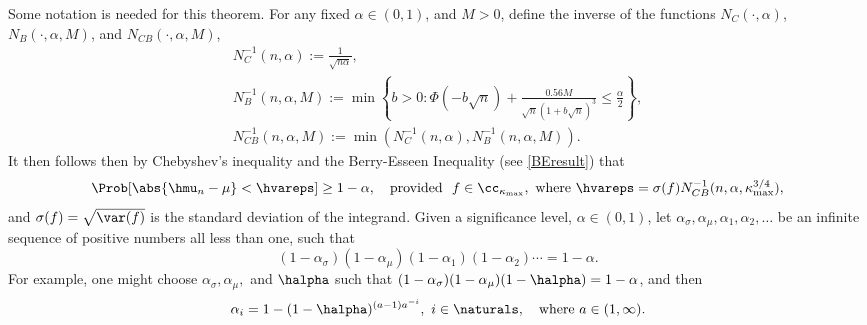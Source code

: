 \documentclass[graybox]{svmult}
\begin{document}
Some notation is needed for this theorem.  For any fixed $\alpha \in (0,1)$, and $M>0$, define the inverse of the functions $N_C(\cdot,\alpha)$, $N_B(\cdot,\alpha,M)$, and $N_{CB}(\cdot,\alpha,M)$,
\begin{gather*}\label{NCinv}
N_C^{-1}(n,\alpha) := \frac{1}{\sqrt{n \alpha}}, \\
\label{NBinv*}
N_B^{-1}(n,\alpha,M) := \min \left \{ b>0 : \Phi\left(-b \sqrt{n}  \right)+\frac{0.56M}{\sqrt{n}\left(1+ b\sqrt{n} \right)^{3}}
\le \frac{\alpha}{2} \right \}, \\
\label{NCBinv*}
N_{CB}^{-1}(n,\alpha,M) := \min(N_C^{-1}(n,\alpha),N_B^{-1}(n,\alpha,M)).
\end{gather*}
It then follows then by Chebyshev's inequality and the Berry-Esseen Inequality (see \eqref{BEresult}) that 
\begin{equation*}
\Prob[\abs{\hmu_n -\mu}<\hvareps] \geq 1-\alpha, \quad \text{provided } \ f \in \cc_{\kappa_{\max}}, \text{ where }\hvareps=\sigma(f) N_{CB}^{-1}(n,\alpha,\kappa_{\max}^{3/4}), 
\end{equation*} 
and $\sigma(f)=\sqrt{\var(f)}$ is the standard deviation of the integrand.  Given a significance level, $\alpha \in (0,1)$, let $\alpha_{\sigma}, \alpha_{\mu}, \alpha_1,  \alpha_2, \ldots$ be an infinite sequence of positive numbers all less than one, such that 
\begin{equation} \label{alphaseq}
(1-\alpha_{\sigma})(1-\alpha_{\mu})(1-\alpha_1)(1-\alpha_2) \cdots = 1-\alpha.
\end{equation}
For example, one might choose $\alpha_{\sigma},\alpha_{\mu},$ and $\halpha$ such that $(1-\alpha_{\sigma})(1-\alpha_{\mu})(1-\halpha)=1-\alpha$, and then 
\begin{equation} \label{alphaseqex}
\alpha_{i} = 1-(1-\halpha)^{(a-1)a^{-i}}, \ i\in \naturals, \quad \text{where} \  a \in (1,\infty).
\end{equation}
\end{document}
